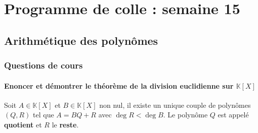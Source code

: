 \documentclass[titlepage, twoside]{report}
\makeatletter
\renewcommand{\tableofcontents}{%
  \@starttoc{toc}
}
\makeatother
\begin{document}
\chapter*{Programme de colle : semaine 15}
\tableofcontents

\section{Arithmétique des polynômes}
\subsection{Questions de cours}
\subsubsection{Enoncer et démontrer le théorème de la division euclidienne sur $\mathbb{K}[X]$}
\begin{tcolorbox}[title=Théorème 16.1, title filled=false, colframe=orange, colback=orange!10!white]
    Soit $A \in \mathbb{K}[X]$ et $B \in \mathbb{K}[X]$ non nul, il existe un unique couple de polynômes $(Q,R)$ tel que $A = BQ + R$ avec $\deg R < \deg B$. Le polynôme $Q$ est appelé \textbf{quotient} et $R$ le \textbf{reste}. 
\end{tcolorbox}
\end{document}
